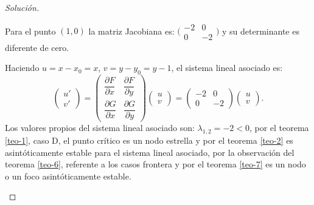 \documentclass[a5paper,doc,10pt,noapacite]{apa6}
\begin{document}
{{\begin{proof}[Solución]
\begin{APAitemize}
\begin{figure}[H]
		\caption{ }
		\label{fig:M-21}
	\end{figure}
	
	\item Para el punto \((1,0)\) la matriz Jacobiana es: \(\Big(\begin{smallmatrix} -2 & 0 \\ 0 & -2 \end{smallmatrix} \Big)\) y su determinante es diferente de cero. 
		
		Haciendo \(u=x-x_0=x\), \(v=y-y_0=y-1\), el sistema lineal asociado es:
		\[
		 \begin{pmatrix}u'\\v'\end{pmatrix}=\begin{pmatrix} \dfrac{\partial F}{\partial x} & \dfrac{\partial F}{\partial y} \\ \dfrac{\partial G}{\partial x} & \dfrac{\partial G}{\partial y}\end{pmatrix}\begin{pmatrix} u \\ v\end{pmatrix}=\begin{pmatrix}-2 & 0 \\ 0 & -2 \end{pmatrix}\begin{pmatrix} u \\ v\end{pmatrix}.
		\]
		Los valores propios del sistema lineal asociado son: \(\lambda_{1,2}=-2<0\), por el teorema \eqref{teo-1}, caso D, el punto crítico es un nodo estrella y por el teorema \eqref{teo-2} es asintóticamente estable para el sistema lineal asociado, por la observación del teorema \eqref{teo-6}, referente a los casos frontera y por el teorema \eqref{teo-7} es un nodo o un foco asintóticamente estable.
		

\end{APAitemize}
\end{proof}}}
\end{document}
